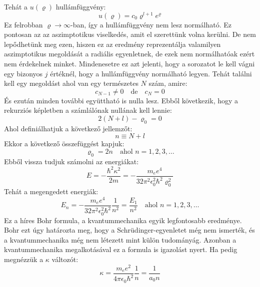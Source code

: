 \documentclass[../main.tex]{subfiles}
\begin{document}
Tehát a $u(\varrho)$ hullámfüggvény:
\begin{equation}
    u(\varrho) = c_0 \varrho^{l + 1} e^{\varrho}
\end{equation}
Ez felrobban $\varrho \to \infty$-ban, így a hullámfüggvény nem lesz normálható. Ez pontosan az az aszimptotikus viselkedés, amit el szerettünk volna kerülni.
De nem lepődhetünk meg ezen, hiszen ez az eredmény reprezentálja valamilyen aszimptotikus megoldását a radiális egyenletnek, de ezek nem normálhatóak ezért 
nem érdekelnek minket. Mindenesetre ez azt jelenti, hogy a sorozatot le kell vágni egy bizonyos $j$ értéknél, hogy a hullámfüggvény normálható legyen.
Tehát találni kell egy megoldást ahol van egy természetes $N$ szám, amire:
\begin{equation}
    c_{N - 1} \neq 0 \quad \text{de} \quad c_N = 0
\end{equation}
És ezután minden további együttható is nulla lesz. Ebből következik, hogy a rekurziós képletben a számlálónak nullának kell lennie:
\begin{equation}
    2(N + l) - \varrho_0 = 0
\end{equation}
Ahol definiálhatjuk a következő jellemzőt:
\begin{equation}
    n \equiv N + l
\end{equation}
Ekkor a következő összefüggést kapjuk:
\begin{equation}
    \varrho_0 = 2 n \quad \text{ahol } n = 1, 2, 3, \ldots
\end{equation}
Ebből vissza tudjuk számolni az energiákat:
\begin{equation}
    E = - \frac{\hbar^2 \kappa^2}{2m} = - \frac{m_e e^4}{32 \pi^2 \epsilon_0^2 \hbar^2 \varrho_0^2}
\end{equation}
Tehát a megengedett energiák:
\begin{equation}
    E_n = - \frac{m_e e^4}{32 \pi^2 \epsilon_0^2 \hbar^2} \frac{1}{n^2} = \frac{E_1}{n^2} \quad \text{ahol } n = 1, 2, 3, \ldots
\end{equation}
Ez a híres Bohr formula, a kvantummechanika egyik legfontosabb eredménye. Bohr ezt úgy határozta meg, hogy a Schrüdinger-egyenletet még nem ismerték,
és a kvantummechanika még nem létezett mint külön tudományág. Azonban a kvantummechanika megalkotásával ez a formula is igazolást nyert.
Ha pedig megnézzük a $\kappa$ változót:
\begin{equation}
    \kappa = \frac{m_e e^2}{4 \pi \epsilon_0 \hbar^2} \frac{1}{n} = \frac{1}{a_0 n}
\end{equation}
\end{document}
